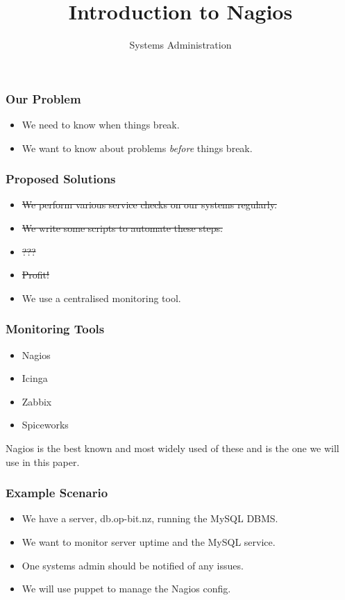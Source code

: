 \documentclass[10pt]{beamer}
\title{Introduction to Nagios}
\author[IN719]{Systems Administration}
\institute[Otago Polytechnic]{
  Otago Polytechnic \\
  Dunedin, New Zealand \\
}
\date{}
\begin{document}
\begin{frame}[plain]
  \titlepage
\end{frame}

\begin{frame}
  \frametitle{Our Problem}
  
\begin{itemize}
\item We need to know when things break. 
\item We want to know about problems \emph{before} things break.
\end{itemize}
\end{frame}


\begin{frame}
  \frametitle{Proposed Solutions}
  
\begin{itemize}
\item \sout{We perform various service checks on our systems regularly.} 
\item \sout{We write some scripts to automate these steps.}
\item \sout{???}
\item \sout{Profit!}
\item We use a centralised monitoring tool.
\end{itemize}
\end{frame}


\begin{frame}
  \frametitle{Monitoring Tools}
  
\begin{itemize}
\item Nagios
\item Icinga
\item Zabbix
\item Spiceworks
\end{itemize}

Nagios is the best known and most widely used of these and is the one we will use in this paper.
\end{frame}


\begin{frame}
  \frametitle{Example Scenario}
  
\begin{itemize}
\item We have a server, db.op-bit.nz, running the MySQL DBMS.
\item We want to monitor server uptime and the MySQL service.
\item One systems admin should be notified of any issues.
\item We will use puppet to manage the Nagios config.
\end{itemize}

\end{frame}
\end{document}
